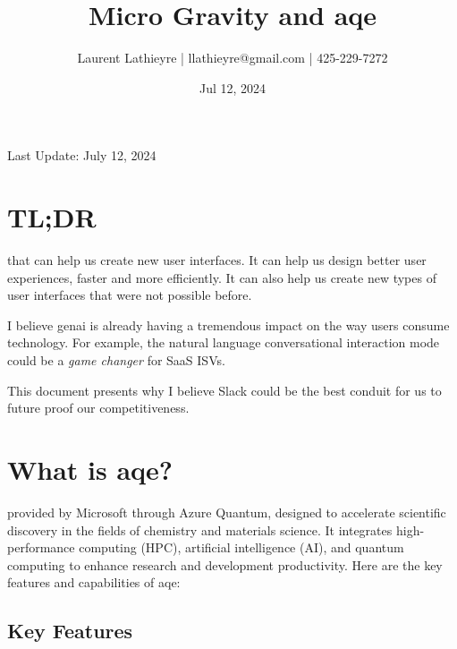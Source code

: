 \documentclass{tufte-handout}
\date{Jul 12, 2024} %
\title{Micro Gravity and \gls{aqe}}
\author{\small Laurent Lathieyre | llathieyre@gmail.com | 425-229-7272}
\begin{document}
\maketitle %
\small Last Update: July 12, 2024


\section{TL;DR}\label{sec:tldr}
 that can help us create new user interfaces. It can help us design better user experiences, faster and more efficiently. It can also help us create new types of user interfaces that were not possible before. 

I believe \gls{genai} is already having a tremendous impact on the way users consume technology. For example, the natural language conversational interaction mode could be a \emph{game changer} for SaaS ISVs.

This document presents why I believe Slack could be the best conduit for us to future proof our competitiveness.\cite{pottsMaterialsScienceMicrogravity2023}

\section{What is \gls{aqe}?}\label{sec:what-is-azure-quantum-elements}
 provided by Microsoft through Azure Quantum, designed to accelerate scientific discovery in the fields of chemistry and materials science. It integrates high-performance computing (HPC), artificial intelligence (AI), and quantum computing to enhance research and development productivity. Here are the key features and capabilities of \gls{aqe}:

\subsection{Key Features}\label{sec:key-features}
\end{document}
